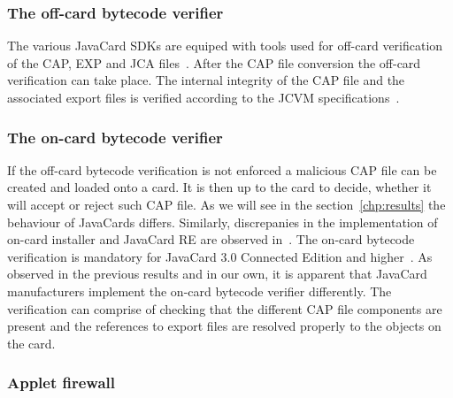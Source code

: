 \documentclass{../llncs/llncs}
\begin{document}
    \subsubsection{The off-card bytecode verifier}

The various JavaCard SDKs are equiped with tools used for off-card verification of the CAP, EXP and JCA files~\cite{jcoffcardverifier}. After the CAP file conversion the off-card verification can take place. The internal integrity of the CAP file and the associated export files is verified according to the JCVM specifications~\cite{jcspecs31download}.

    \subsubsection{The on-card bytecode verifier}

    If the off-card bytecode verification is not enforced a malicious CAP file can be created and loaded onto a card. It is then up to the card to decide, whether it will accept or reject such CAP file. As we will see in the section~\ref{chp:results} the behaviour of JavaCards differs. Similarly, discrepanies in the implementation of on-card installer and JavaCard RE are observed in~\cite{lanettrojan}. The on-card bytecode verification is mandatory for JavaCard 3.0 Connected Edition and higher~\cite{barbusecond}. As observed in the previous results and in our own, it is apparent that JavaCard manufacturers implement the on-card bytecode verifier differently.
    The verification can comprise of checking that the different CAP file components are present and the references to export files are resolved properly to the objects on the card.


    \subsubsection{Applet firewall}
\end{document}
